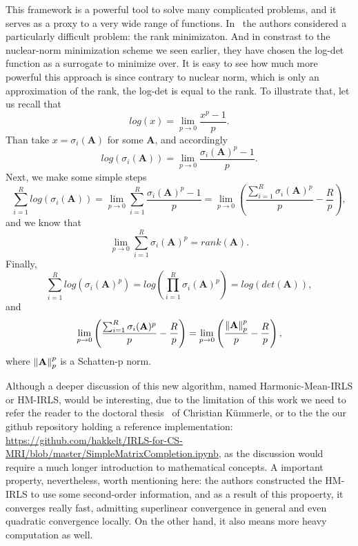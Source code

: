This framework is a powerful tool to solve many complicated problems, and it serves as a proxy to a very wide range of functions. In~\cite{kummerle_denoising_2018, kummerle_understanding_nodate} the authors considered a particularly difficult problem: the rank minimizaton. And in constrast to the nuclear-norm minimization scheme we seen earlier, they have chosen the log-det function as a surrogate to minimize over. It is easy to see how much more powerful this approach is since contrary to nuclear norm, which is only an approximation of the rank, the log-det is equal to the rank. To illustrate that, let us recall that
\[log(x) = \lim_{p \rightarrow 0} \frac{x^p - 1}{p}.\]
Than take $x = \sigma_i(\mathbf{A})$ for some $\mathbf{A}$, and accordingly
\[log(\sigma_i(\mathbf{A})) = \lim_{p \rightarrow 0} \frac{\sigma_i(\mathbf{A})^p - 1}{p}.\]
Next, we make some simple steps
\[\sum_{i=1}^R log(\sigma_i(\mathbf{A})) = \lim_{p \rightarrow 0} \sum_{i=1}^R \frac{\sigma_i(\mathbf{A})^p - 1}{p} = \lim_{p \rightarrow 0} \left( \frac{ \sum_{i=1}^R \sigma_i(\mathbf{A})^p}{p} - \frac{R}{p}\right),\]
and we know that
\[ \lim_{p \rightarrow 0} \sum_{i=1}^R \sigma_i(\mathbf{A})^p = rank(\mathbf{A}).\]
Finally,
\[\sum_{i=1}^R log\left(\sigma_i(\mathbf{A})^p\right) = log\left(\prod_{i=1}^R \sigma_i(\mathbf{A})^p\right) = log(det(\mathbf{A})),\]
and
\[\lim_{p \rightarrow 0} \left( \frac{ \sum_{i=1}^R \sigma_i(\mathbf{A})^p}{p} - \frac{R}{p}\right) = \lim_{p \rightarrow 0} \left( \frac{\left\lVert\mathbf{A}\right\rVert_p^p}{p} - \frac{R}{p}\right),\]
where $\left\lVert\mathbf{A}\right\rVert_p^p$ is a Schatten-p norm.

Although a deeper discussion of this new algorithm, named Harmonic-Mean-IRLS or HM-IRLS, would be interesting, due to the limitation of this work we need to refer the reader to the doctoral thesis~\cite{kummerle_understanding_nodate} of Christian Kümmerle, or to the the our github repository holding a reference implementation:
\url{https://github.com/hakkelt/IRLS-for-CS-MRI/blob/master/SimpleMatrixCompletion.ipynb}, as the discussion would require a much longer introduction to mathematical concepts. A important property, nevertheless, worth mentioning here: the authors constructed the HM-IRLS to use some second-order information, and as a result of this propoerty, it converges really fast, admitting superlinear convergence in general and even quadratic convergence locally. On the other hand, it also means more heavy computation as well.

